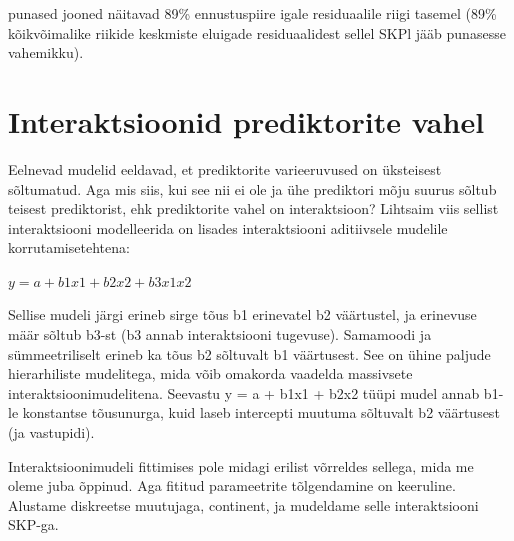 \documentclass[]{book}
\begin{document}
punased jooned näitavad 89\% ennustuspiire igale residuaalile riigi
tasemel (89\% kõikvõimalike riikide keskmiste eluigade residuaalidest
sellel SKPl jääb punasesse vahemikku).

\section*{Interaktsioonid prediktorite
vahel}\label{interaktsioonid-prediktorite-vahel}

Eelnevad mudelid eeldavad, et prediktorite varieeruvused on üksteisest
sõltumatud. Aga mis siis, kui see nii ei ole ja ühe prediktori mõju
suurus sõltub teisest prediktorist, ehk prediktorite vahel on
interaktsioon? Lihtsaim viis sellist interaktsiooni modelleerida on
lisades interaktsiooni aditiivsele mudelile korrutamisetehtena:

\(y = a + b1x1 + b2x2 + b3x1x2\)

Sellise mudeli järgi erineb sirge tõus b1 erinevatel b2 väärtustel, ja
erinevuse määr sõltub b3-st (b3 annab interaktsiooni tugevuse).
Samamoodi ja sümmeetriliselt erineb ka tõus b2 sõltuvalt b1 väärtusest.
See on ühine paljude hierarhiliste mudelitega, mida võib omakorda
vaadelda massivsete interaktsioonimudelitena. Seevastu y = a + b1x1 +
b2x2 tüüpi mudel annab b1-le konstantse tõusunurga, kuid laseb
intercepti muutuma sõltuvalt b2 väärtusest (ja vastupidi).

Interaktsioonimudeli fittimises pole midagi erilist võrreldes sellega,
mida me oleme juba õppinud. Aga fititud parameetrite tõlgendamine on
keeruline. Alustame diskreetse muutujaga, continent, ja mudeldame selle
interaktsiooni SKP-ga.
\end{document}
